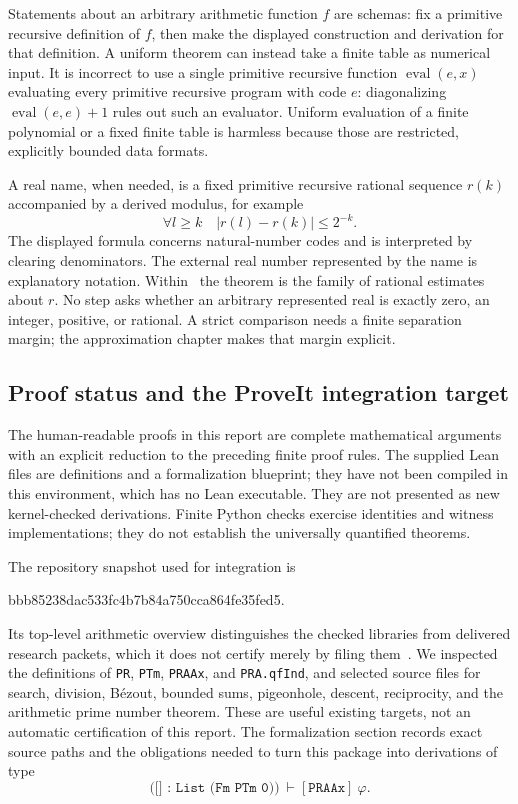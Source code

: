 Statements about an arbitrary arithmetic function $f$ are schemas: fix a primitive recursive definition of $f$, then make the displayed construction and derivation for that definition. A uniform theorem can instead take a finite table as numerical input. It is incorrect to use a single primitive recursive function $\operatorname{eval}(e,x)$ evaluating every primitive recursive program with code $e$: diagonalizing $\operatorname{eval}(e,e)+1$ rules out such an evaluator. Uniform evaluation of a finite polynomial or a fixed finite table is harmless because those are restricted, explicitly bounded data formats.

A real name, when needed, is a fixed primitive recursive rational sequence $r(k)$ accompanied by a derived modulus, for example
\[
 \forall l\ge k\quad |r(l)-r(k)|\le 2^{-k}.
\]
The displayed formula concerns natural-number codes and is interpreted by clearing denominators. The external real number represented by the name is explanatory notation. Within \ipra\ the theorem is the family of rational estimates about $r$. No step asks whether an arbitrary represented real is exactly zero, an integer, positive, or rational. A strict comparison needs a finite separation margin; the approximation chapter makes that margin explicit.

\subsection{Proof status and the ProveIt integration target}
The human-readable proofs in this report are complete mathematical arguments with an explicit reduction to the preceding finite proof rules. The supplied Lean files are definitions and a formalization blueprint; they have not been compiled in this environment, which has no Lean executable. They are not presented as new kernel-checked derivations. Finite Python checks exercise identities and witness implementations; they do not establish the universally quantified theorems.

The repository snapshot used for integration is
\begin{center}\small\ttfamily bbb85238dac533fc4b7b84a750cca864fe35fed5.\end{center}
Its top-level arithmetic overview distinguishes the checked libraries from delivered research packets, which it does not certify merely by filing them~\cite{proveit-readme}. We inspected the definitions of \texttt{PR}, \texttt{PTm}, \texttt{PRAAx}, and \texttt{PRA.qfInd}, and selected source files for search, division, B\'ezout, bounded sums, pigeonhole, descent, reciprocity, and the arithmetic prime number theorem. These are useful existing targets, not an automatic certification of this report. The formalization section records exact source paths and the obligations needed to turn this package into derivations of type
\[
 \texttt{([] : List (Fm PTm 0))}\ \vdash[\texttt{PRAAx}]\ \varphi.
\]
